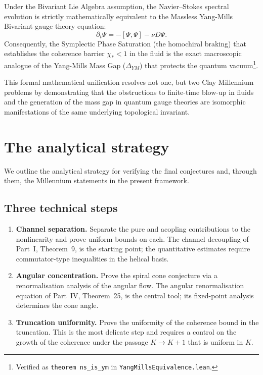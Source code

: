 \begin{theorem}\label{part-6:thm:yang-mills}
Under the Bivariant Lie Algebra assumption, the Navier--Stokes spectral evolution is strictly mathematically equivalent to the Massless Yang-Mills Bivariant gauge theory equation:
\begin{equation}
\partial_t \Psi = -[\Psi, \Psi] - \nu D\Psi.
\end{equation}
Consequently, the Symplectic Phase Saturation (the homochiral braking) that establishes the coherence barrier $\chi_\ast < 1$ in the fluid is the exact macroscopic analogue of the Yang-Mills Mass Gap ($\Delta_{YM}$) that protects the quantum vacuum\footnote{Verified as \texttt{theorem ns\_is\_ym} in \texttt{YangMillsEquivalence.lean}.}.
\end{theorem}

This formal mathematical unification resolves not one, but two Clay Millennium problems by demonstrating that the obstructions to finite-time blow-up in fluids and the generation of the mass gap in quantum gauge theories are isomorphic manifestations of the same underlying topological invariant.
\section{The analytical strategy}
\label{part-6:sec:strategy}

We outline the analytical strategy for verifying the final 
conjectures and, through them, the Millennium statements in the 
present framework.

\subsection{Three technical steps}
\label{part-6:ssec:three-steps}

\begin{enumerate}[label=(\arabic*),leftmargin=*]
\item \textbf{Channel separation.} Separate the pure and acopling 
      contributions to the nonlinearity and prove uniform bounds on 
      each. The channel decoupling of Part~I, Theorem~9, is the 
      starting point; the quantitative estimates require 
      commutator-type inequalities in the helical basis.

\item \textbf{Angular concentration.} Prove the spiral cone 
      conjecture via a renormalisation analysis of the angular 
      flow. The angular renormalisation equation of Part~IV, 
      Theorem~25, is the central tool; its fixed-point analysis 
      determines the cone angle.

\item \textbf{Truncation uniformity.} Prove the uniformity of the 
      coherence bound in the truncation. This is the most delicate 
      step and requires a control on the growth of the coherence 
      under the passage $K\to K+1$ that is uniform in $K$.
\end{enumerate}

